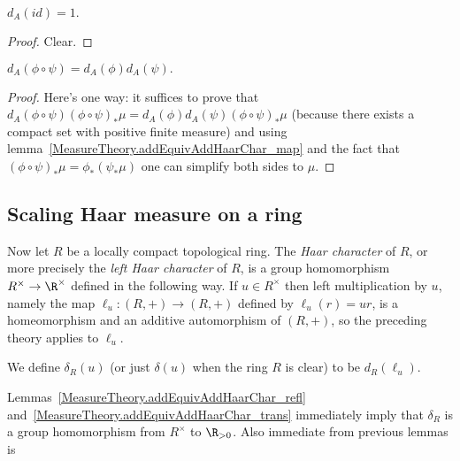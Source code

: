 \begin{lemma}
  \label{MeasureTheory.addEquivAddHaarChar_refl}
  \leanok
  $d_A(id)=1.$
\end{lemma}
\begin{proof}
  \leanok
  Clear.
\end{proof}

\begin{lemma}
  \label{MeasureTheory.addEquivAddHaarChar_trans}
  \leanok
  $d_A(\phi\circ\psi)=d_A(\phi)d_A(\psi).$
\end{lemma}
\begin{proof}
  \leanok
  Here's one way: it suffices to prove that
  $d_A(\phi\circ\psi)(\phi\circ\psi)_*\mu=d_A(\phi)d_A(\psi)(\phi\circ\psi)_*\mu$
  (because there exists a compact set with positive finite measure)
  and using lemma~\ref{MeasureTheory.addEquivAddHaarChar_map}
  and the fact that $(\phi\circ\psi)_*\mu=\phi_*(\psi_*\mu)$
  one can simplify both sides to $\mu$.
\end{proof}

\subsection{Scaling Haar measure on a ring}

Now let $R$ be a locally compact topological ring. The \emph{Haar character} of $R$,
or more precisely the \emph{left Haar character} of $R$, is a group homomorphism
$R^\times\to\R^\times$ defined in the following way. If $u\in R^\times$ then left multiplication
by $u$, namely the map $\ell_u:(R,+)\to(R,+)$ defined by $\ell_u(r)=ur$, is a homeomorphism and
an additive automorphism of $(R,+)$, so the preceding theory applies to $\ell_u$.

\begin{definition}
  \label{MeasureTheory.ringHaarChar}
  \leanok
  We define $\delta_R(u)$ (or just $\delta(u)$ when the ring $R$ is clear) to be $d_R(\ell_u)$.
\end{definition}

Lemmas~\ref{MeasureTheory.addEquivAddHaarChar_refl}
and~\ref{MeasureTheory.addEquivAddHaarChar_trans} immediately imply that $\delta_R$ is a group
homomorphism from $R^\times$ to $\R_{>0}$.
Also immediate from previous lemmas is


